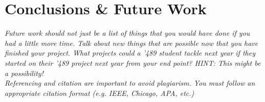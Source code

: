\documentclass[conference]{IEEEtran}
\begin{document}
\section{Conclusions \& Future Work}

\textit{Future work should not just be a list of things that you would have done if you had a little more time. Talk about new things that are possible now that you have finished your project. What projects could a ’489 student tackle next year if they started on their '489 project next year from your end point? HINT: This might be a possibility!} \\









\textit{Referencing and citation are important to avoid plagiarism. You must follow an appropriate citation format (e.g. IEEE, Chicago, APA, etc.)} \\
\end{document}
